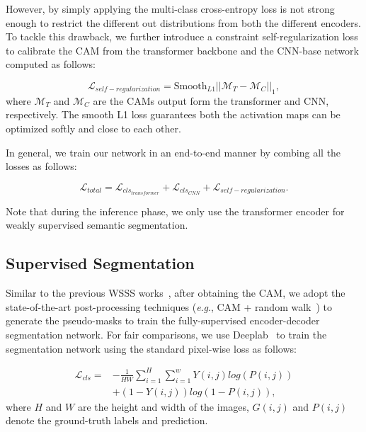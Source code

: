 \documentclass[journal]{IEEEtran}
\newcommand{\eg}{\textit{e}.\textit{g}., }
\begin{document}
However, by simply applying the multi-class cross-entropy loss is not strong enough to restrict the different out distributions from both the different encoders. To tackle this drawback, we further introduce a constraint self-regularization loss to calibrate the CAM from the transformer backbone and the CNN-base network computed as follows:


\begin{equation}
\mathcal{L}_{self-regularization} = \text{Smooth}_{L1}|| \mathcal{M}_{T} - \mathcal{M}_{C} ||_{1}, \tag{5}
\label{eq5}
\end{equation}
where $\mathcal{M}_{T}$ and $\mathcal{M}_{C}$ are the CAMs output form the transformer and CNN, respectively. The smooth L1 loss guarantees both the activation maps can be optimized softly and close to each other.

In general, we train our network in an end-to-end manner by combing all the losses as follows:

\begin{equation}
\mathcal{L}_{total} = \mathcal{L}_{cls_{transformer}} + \mathcal{L}_{cls_{CNN}} + \mathcal{L}_{self-regularization}. \tag{6}
\label{eq6}
\end{equation}

Note that during the inference phase, we only use the transformer encoder for weakly supervised semantic segmentation.

\subsection{Supervised Segmentation}
Similar to the previous WSSS works~\cite{wang2020self,ahn2018learning}, after obtaining the CAM, we adopt the state-of-the-art post-processing techniques (\eg CAM + random walk~\cite{ahn2018learning}) to generate the pseudo-masks to train the fully-supervised encoder-decoder segmentation network. For fair comparisons, we use Deeplab~\cite{chen2014semantic} to train the segmentation network using the standard pixel-wise loss as follows:

\begin{equation}
\begin{split}
\mathcal{L}_{cls} = &-\frac{1}{HW} \sum_{i=1}^{H} \sum_{i=1}^{w} Y(i,j) log(P(i,j)) \\
& + (1 - Y(i,j)) log(1- P(i,j)),
\end{split}
\tag{7}
\label{eq7}
\end{equation}
where $H$ and $W$ are the height and width of the images, $G(i,j)$ and $P(i,j)$ denote the ground-truth labels and prediction.
\end{document}
